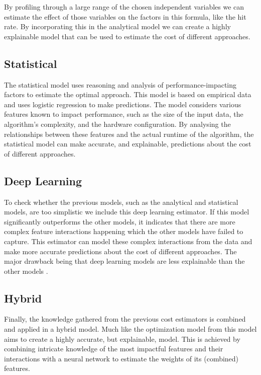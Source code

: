 By profiling through a large range of the chosen independent variables we can estimate the effect of those variables on the factors in this formula, like the hit rate. By incorporating this in the analytical model we can create a highly explainable model that can be used to estimate the cost of different approaches.

\subsection{Statistical}
The statistical model uses reasoning and analysis of performance-impacting factors to estimate the optimal approach. This model is based on empirical data and uses logistic regression to make predictions. The model considers various features known to impact performance, such as the size of the input data, the algorithm's complexity, and the hardware configuration. By analysing the relationships between these features and the actual runtime of the algorithm, the statistical model can make accurate, and explainable, predictions about the cost of different approaches.

\subsection{Deep Learning}
To check whether the previous models, such as the analytical and statistical models, are too simplistic we include this deep learning estimator. If this model significantly outperforms the other models, it indicates that there are more complex feature interactions happening which the other models have failed to capture. This estimator can model these complex interactions from the data and make more accurate predictions about the cost of different approaches. The major drawback being that deep learning models are less explainable than the other models \cite{explainable-deep-learning}.

\subsection{Hybrid}
Finally, the knowledge gathered from the previous cost estimators is combined and applied in a hybrid model. Much like the optimization model from \cite{halide_cost_model} this model aims to create a highly accurate, but explainable, model. This is achieved by combining intricate knowledge of the most impactful features and their interactions with a neural network to estimate the weights of its (combined) features.

